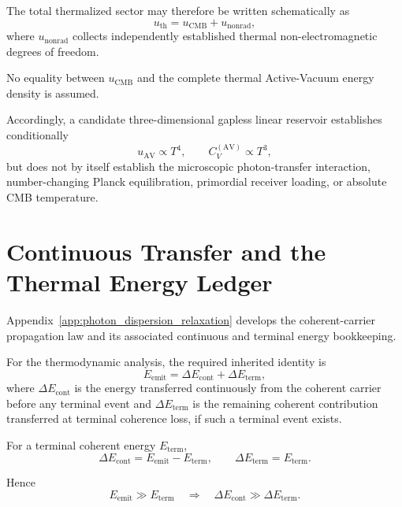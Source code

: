 The total thermalized sector may therefore be written schematically as
\begin{equation}
    u_{\mathrm{th}}
    =
    u_{\mathrm{CMB}}
    +
    u_{\mathrm{nonrad}},
    \label{eq:AT_total_thermal_partition}
\end{equation}
where
\(u_{\mathrm{nonrad}}\)
collects independently established thermal non-electromagnetic degrees of
freedom.

No equality between
\(u_{\mathrm{CMB}}\)
and the complete thermal Active-Vacuum energy density is assumed.

Accordingly, a candidate three-dimensional gapless linear reservoir
establishes conditionally
\begin{equation}
    u_{\mathrm{AV}}\propto T^4,
    \qquad
    C_V^{(\mathrm{AV})}\propto T^3,
\end{equation}
but does not by itself establish the microscopic photon-transfer interaction,
number-changing Planck equilibration, primordial receiver loading, or
absolute CMB temperature.


\section{Continuous Transfer and the Thermal Energy Ledger}

Appendix~\ref{app:photon_dispersion_relaxation}
develops the coherent-carrier propagation law and its associated continuous
and terminal energy bookkeeping.

For the thermodynamic analysis, the required inherited identity is
\begin{equation}
    E_{\mathrm{emit}}
    =
    \Delta E_{\mathrm{cont}}
    +
    \Delta E_{\mathrm{term}},
    \label{eq:AT_total_energy_ledger}
\end{equation}
where
\(\Delta E_{\mathrm{cont}}\)
is the energy transferred continuously from the coherent carrier before any
terminal event and
\(\Delta E_{\mathrm{term}}\)
is the remaining coherent contribution transferred at terminal coherence
loss, if such a terminal event exists.

For a terminal coherent energy
\(E_{\mathrm{term}}\),
\begin{equation}
    \Delta E_{\mathrm{cont}}
    =
    E_{\mathrm{emit}}
    -
    E_{\mathrm{term}},
    \qquad
    \Delta E_{\mathrm{term}}
    =
    E_{\mathrm{term}}.
    \label{eq:AT_energy_partition}
\end{equation}

Hence
\begin{equation}
    E_{\mathrm{emit}}
    \gg
    E_{\mathrm{term}}
    \quad
    \Longrightarrow
    \quad
    \Delta E_{\mathrm{cont}}
    \gg
    \Delta E_{\mathrm{term}}.
    \label{eq:AT_terminal_subdominant_limit}
\end{equation}

